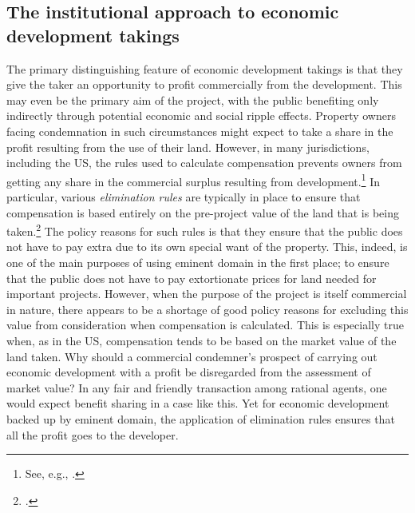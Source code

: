 \subsection{The institutional approach to economic development takings}\label{subsec:ins}

The primary distinguishing feature of economic development takings is that they give the taker an opportunity to profit commercially from the development. This may even be the primary aim of the project, with the public benefiting only indirectly through potential economic and social ripple effects. Property owners facing condemnation in such circumstances might expect to take a share in the profit resulting from the use of their land. However, in many jurisdictions, including the US, the rules used to calculate compensation prevents owners from getting any share in the commercial surplus resulting from development.\footnote{See, e.g., \cite[965-966]{fennell04}.} In particular, various {\it elimination rules} are typically in place to ensure that compensation is based entirely on the pre-project value of the land that is being taken.\footcite[See][81]{ackerman06} The policy reasons for such rules is that they ensure that the public does not have to pay extra due to its own special want of the property. This, indeed, is one of the main purposes of using eminent domain in the first place; to ensure that the public does not have to pay extortionate prices for land needed for important projects. However, when the purpose of the project is itself commercial in nature, there appears to be a shortage of good policy reasons for excluding this value from consideration when compensation is calculated. This is especially true when, as in the US, compensation tends to be based on the market value of the land taken. Why should a commercial condemner's prospect of carrying out economic development with a profit be disregarded from the assessment of market value? In any fair and friendly transaction among rational agents, one would expect benefit sharing in a case like this. Yet for economic development backed up by eminent domain, the application of elimination rules ensures that all the profit goes to the developer. 

